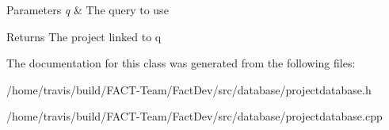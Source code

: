 \begin{DoxyParams}{Parameters}
{\em q} & The query to use \\
\hline
\end{DoxyParams}
\begin{DoxyReturn}{Returns}
The project linked to q 
\end{DoxyReturn}


The documentation for this class was generated from the following files\-:\begin{DoxyCompactItemize}
\item 
/home/travis/build/\-F\-A\-C\-T-\/\-Team/\-Fact\-Dev/src/database/projectdatabase.\-h\item 
/home/travis/build/\-F\-A\-C\-T-\/\-Team/\-Fact\-Dev/src/database/projectdatabase.\-cpp\end{DoxyCompactItemize}
